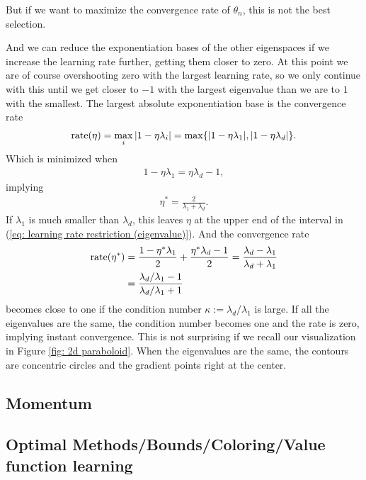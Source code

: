 But if we want to maximize the convergence rate of \(\theta_n\), this is not
the best selection.

And we can reduce the exponentiation bases of the other eigenspaces if we
increase the learning rate further, getting them closer to zero. At this point
we are of course overshooting zero with the largest learning rate, so we only
continue with this until we get closer to \(-1\) with the largest eigenvalue
than we are to \(1\) with the smallest. The largest absolute exponentiation base
is the convergence rate
%
\begin{align*}
	\text{rate}(\eta)=\max_{i} |1-\eta\lambda_i| = \max\{|1-\eta\lambda_1|, |1-\eta\lambda_d|\}.
\end{align*}
%
Which is minimized when
%
\begin{align*}
	1-\eta\lambda_1 = \eta\lambda_d -1,
\end{align*}
%
implying
%
\begin{align*}
	\eta^* = \frac{2}{\lambda_1 + \lambda_d}.
\end{align*}
%
If \(\lambda_1\) is much smaller than \(\lambda_d\), this leaves \(\eta\)
at the upper end of the interval in (\ref{eq: learning rate restriction
(eigenvalue)}). And the convergence rate
%
\begin{align*}
	\text{rate}(\eta^*)
	&= \frac{1-\eta^* \lambda_1}{2} + \frac{\eta^*\lambda_d -1}{2}
	= \frac{\lambda_d - \lambda_1}{\lambda_d + \lambda_1}\\
	&= \frac{\lambda_d/\lambda_1-1}{\lambda_d/\lambda_1+1}
\end{align*}
%
becomes close to one if the condition number \(\kappa:=\lambda_d/\lambda_1\)
is large.
If all the eigenvalues are the same, the condition number becomes one and the
rate is zero, implying instant convergence. This is not surprising if we recall
our visualization in Figure \ref{fig: 2d paraboloid}. When the eigenvalues are
the same, the contours are concentric circles and the gradient points right at
the center.


\subsection{Momentum}

\subsection{Optimal Methods/Bounds/Coloring/Value function learning}

